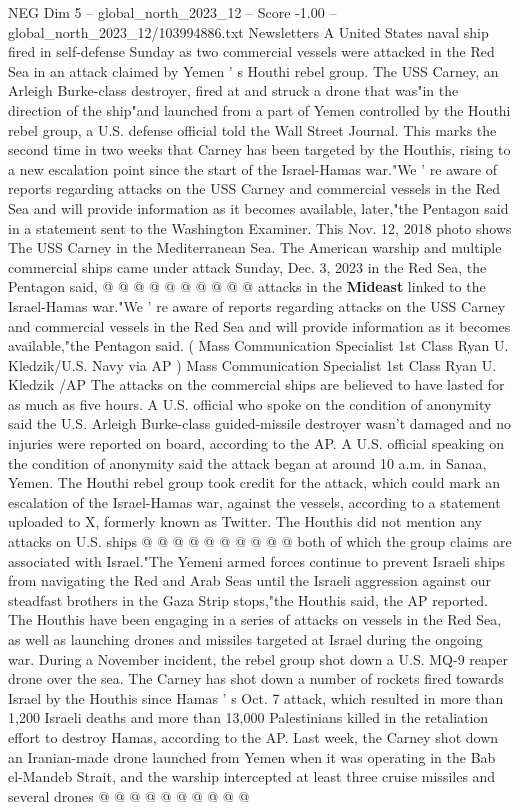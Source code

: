 \begin{textsample}{NEG Dim 5 – global\_north\_2023\_12 – Score -1.00 – global\_north\_2023\_12/103994886.txt}  \label{ex:f5_neg_113}
Newsletters A United States naval ship fired in self-defense Sunday as two commercial vessels were attacked in the Red Sea in an attack claimed by Yemen ' s Houthi rebel group.
The USS Carney, an Arleigh Burke-class destroyer, fired at and struck a drone that was"in the direction of the ship"and launched from a part of Yemen controlled by the Houthi rebel group, a U.S. defense official told the Wall Street Journal.
This marks the second time in two weeks that Carney has been targeted by the Houthis, rising to a new escalation point since the start of the Israel-Hamas war."We ' re aware of reports regarding attacks on the USS Carney and commercial vessels in the Red Sea and will provide information as it becomes available, later,"the Pentagon said in a statement sent to the Washington Examiner.
This Nov. 12, 2018 photo shows The USS Carney in the Mediterranean Sea.
The American warship and multiple commercial ships came under attack Sunday, Dec. 3, 2023 in the Red Sea, the Pentagon said, @ @ @ @ @ @ @ @ @ @ attacks in the \textbf{Mideast} linked to the Israel-Hamas war."We ' re aware of reports regarding attacks on the USS Carney and commercial vessels in the Red Sea and will provide information as it becomes available,"the Pentagon said. ( Mass Communication Specialist 1st Class Ryan U.
Kledzik/U.S.
Navy via AP ) Mass Communication Specialist 1st Class Ryan U.
Kledzik /AP The attacks on the commercial ships are believed to have lasted for as much as five hours.
A U.S. official who spoke on the condition of anonymity said the U.S.
Arleigh Burke-class guided-missile destroyer wasn't damaged and no injuries were reported on board, according to the AP.
A U.S. official speaking on the condition of anonymity said the attack began at around 10 a.m. in Sanaa, Yemen.
The Houthi rebel group took credit for the attack, which could mark an escalation of the Israel-Hamas war, against the vessels, according to a statement uploaded to X, formerly known as Twitter.
The Houthis did not mention any attacks on U.S. ships @ @ @ @ @ @ @ @ @ @ both of which the group claims are associated with Israel."The Yemeni armed forces continue to prevent Israeli ships from navigating the Red and Arab Seas until the Israeli aggression against our steadfast brothers in the Gaza Strip stops,"the Houthis said, the AP reported.
The Houthis have been engaging in a series of attacks on vessels in the Red Sea, as well as launching drones and missiles targeted at Israel during the ongoing war.
During a November incident, the rebel group shot down a U.S.
MQ-9 reaper drone over the sea.
The Carney has shot down a number of rockets fired towards Israel by the Houthis since Hamas ' s Oct. 7 attack, which resulted in more than 1,200 Israeli deaths and more than 13,000 Palestinians killed in the retaliation effort to destroy Hamas, according to the AP.
Last week, the Carney shot down an Iranian-made drone launched from Yemen when it was operating in the Bab el-Mandeb Strait, and the warship intercepted at least three cruise missiles and several drones @ @ @ @ @ @ @ @ @ @

\end{textsample}

